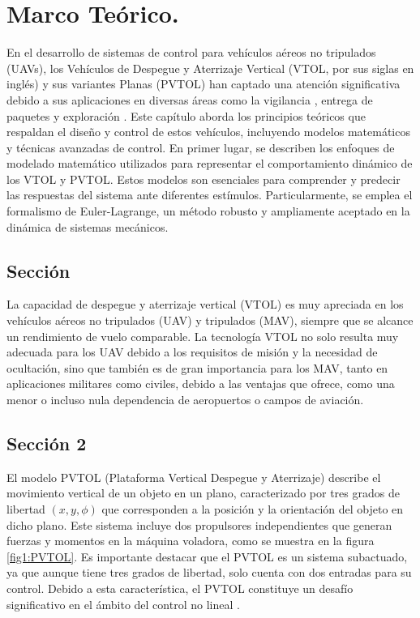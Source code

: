 \chapter{Marco Teórico.}

En el desarrollo de sistemas de control para vehículos aéreos no tripulados (UAVs), los Vehículos de Despegue y Aterrizaje Vertical (VTOL, por sus siglas en inglés) y sus variantes Planas (PVTOL) han captado una atención significativa debido a sus aplicaciones en diversas áreas como la vigilancia \cite{johnson1997arti}, entrega de paquetes \cite{9129495} y exploración \cite{5278262}. Este capítulo aborda los principios teóricos que respaldan el diseño y control de estos vehículos, incluyendo modelos matemáticos y técnicas avanzadas de control.
En primer lugar, se describen los enfoques de modelado matemático utilizados para representar el comportamiento dinámico de los VTOL y PVTOL. Estos modelos son esenciales para comprender y predecir las respuestas del sistema ante diferentes estímulos. Particularmente, se emplea el formalismo de Euler-Lagrange, un método robusto y ampliamente aceptado en la dinámica de sistemas mecánicos.

\section{Sección}

La capacidad de despegue y aterrizaje vertical (VTOL) es muy apreciada en los vehículos aéreos no tripulados (UAV) y tripulados (MAV), siempre que se alcance un rendimiento de vuelo comparable. La tecnología VTOL no solo resulta muy adecuada para los UAV debido a los requisitos de misión y la necesidad de ocultación, sino que también es de gran importancia para los MAV, tanto en aplicaciones militares como civiles, debido a las ventajas que ofrece, como una menor o incluso nula dependencia de aeropuertos o campos de aviación.

\section{Sección 2}

El modelo PVTOL (Plataforma Vertical Despegue y Aterrizaje) describe el movimiento vertical de un objeto en un plano, caracterizado por tres grados de libertad $(x, y, \phi)$ que corresponden a la posición y la orientación del objeto en dicho plano. Este sistema incluye dos propulsores independientes que generan fuerzas y momentos en la máquina voladora, como se muestra en la figura \ref{fig1:PVTOL}. Es importante destacar que el PVTOL es un sistema subactuado, ya que aunque tiene tres grados de libertad, solo cuenta con dos entradas para su control. Debido a esta característica, el PVTOL constituye un desafío significativo en el ámbito del control no lineal \cite{lin1999robust}.


